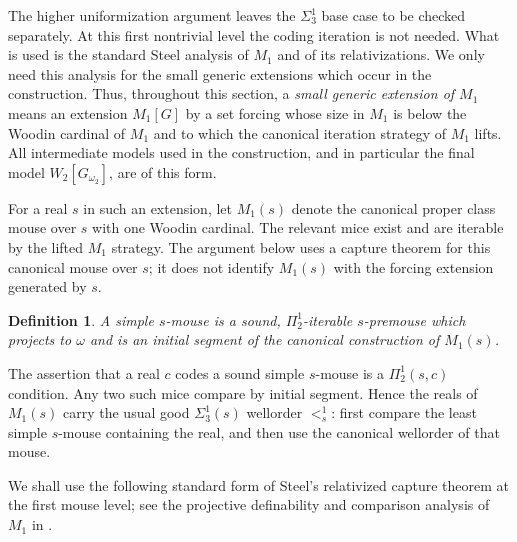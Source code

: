 \documentclass[a4paper,11pt]{article}
\newtheorem{definition}[theorem]{Definition}
\begin{document}
The higher uniformization argument leaves the $\Sigma^1_3$ base case to be checked separately.  At this first nontrivial level the coding iteration is not needed.  What is used is the standard Steel analysis of $M_1$ and of its relativizations.  We only need this analysis for the small generic extensions which occur in the construction.  Thus, throughout this section, a \emph{small generic extension of $M_1$} means an extension $M_1[G]$ by a set forcing whose size in $M_1$ is below the Woodin cardinal of $M_1$ and to which the canonical iteration strategy of $M_1$ lifts.  All intermediate models used in the construction, and in particular the final model $W_2[G_{\omega_2}]$, are of this form.

For a real $s$ in such an extension, let $M_1(s)$ denote the canonical proper class mouse over $s$ with one Woodin cardinal.  The relevant mice exist and are iterable by the lifted $M_1$ strategy.  The argument below uses a capture theorem for this canonical mouse over $s$; it does not identify $M_1(s)$ with the forcing extension generated by $s$.

\begin{definition}
A \emph{simple $s$-mouse} is a sound, $\Pi^1_2$-iterable $s$-premouse which projects to $\omega$ and is an initial segment of the canonical construction of $M_1(s)$.
\end{definition}

The assertion that a real $c$ codes a sound simple $s$-mouse is a $\Pi^1_2(s,c)$ condition.  Any two such mice compare by initial segment.  Hence the reals of $M_1(s)$ carry the usual good $\Sigma^1_3(s)$ wellorder $<^1_s$: first compare the least simple $s$-mouse containing the real, and then use the canonical wellorder of that mouse.

We shall use the following standard form of Steel's relativized capture theorem at the first mouse level; see the projective definability and comparison analysis of $M_1$ in \cite{Steel2,Steel3}.
\end{document}
